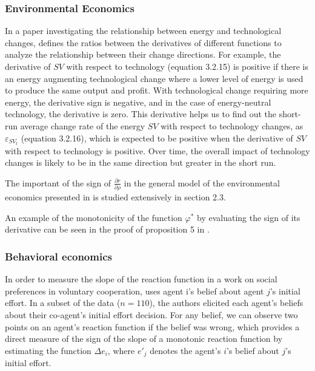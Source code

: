 \documentclass[11pt]{book}
\begin{document}

\subsubsection{Environmental Economics}

In a paper investigating the relationship between energy and technological changes, \cite{khademvatani2009measuring} defines the ratios between the derivatives of different
functions to analyze the relationship between their change
directions. For example, the derivative of $SV$ with respect to technology
(equation 3.2.15) is positive if there is an energy augmenting technological
change where a lower level of energy is used to produce the same output
and profit. With technological change requiring more energy, the derivative
sign is negative, and in the case of energy-neutral technology, the
derivative is zero. This derivative helps us to find out the short-run
average change rate of the energy $SV$ with respect to technology
changes, as $\varepsilon_{SV_{t}}$ (equation 3.2.16), which is expected
to be positive when the derivative of $SV$ with respect to technology
is positive. Over time, the overall impact of technology changes is
likely to be in the same direction but greater in the short run.

The important of the sign of $\frac{\partial r}{\partial\rho}$ in the general model of the environmental economics presented in \cite{jeon2014three} is studied extensively in section 2.3.

An example of the monotonicity
of the function $\varphi^{*}$ by evaluating the sign of its derivative can be seen in the proof of proposition 5 in \cite{bell2018three}.


\subsubsection{Behavioral economics}

In order to measure the slope of the reaction function in a work on social preferences in voluntary
cooperation, \cite{thoni2015peer}
uses agent i's belief about agent $j$'s initial effort. In a subset
of the data ($n=110$), the authors elicited each agent's beliefs about
their co-agent's initial effort decision. For any belief, we can
observe two points on an agent's reaction function if the belief was
wrong, which provides a direct measure of the sign of the slope of a
monotonic reaction function by estimating the function $\Delta e_{i}$,
where $e'_{j}$ denotes the agent's $i$'s belief about $j$'s initial effort.
\end{document}
